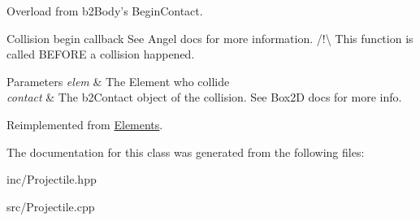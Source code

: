 Overload from b2\+Body's Begin\+Contact. 

Collision begin callback See Angel docs for more information. /!\textbackslash{} This function is called B\+E\+F\+O\+R\+E a collision happened. 
\begin{DoxyParams}{Parameters}
{\em elem} & The Element who collide \\
\hline
{\em contact} & The b2\+Contact object of the collision. See Box2\+D docs for more info. \\
\hline
\end{DoxyParams}


Reimplemented from \hyperlink{class_elements}{Elements}.



The documentation for this class was generated from the following files\+:\begin{DoxyCompactItemize}
\item 
inc/Projectile.\+hpp\item 
src/Projectile.\+cpp\end{DoxyCompactItemize}
